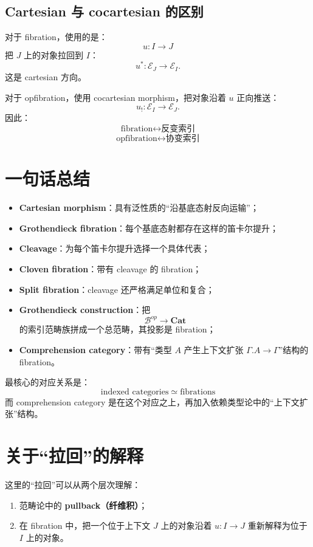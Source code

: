 \documentclass[12pt,a4paper]{article}
\begin{document}
\subsection{Cartesian 与 cocartesian 的区别}
对于 fibration，使用的是：
\[
u:I\to J
\]
把 \(J\) 上的对象拉回到 \(I\)：
\[
u^*:\mathcal{E}_J\to\mathcal{E}_I.
\]
这是 cartesian 方向。

对于 opfibration，使用 cocartesian morphism，把对象沿着 \(u\) 正向推送：
\[
u_!:\mathcal{E}_I\to\mathcal{E}_J.
\]
因此：
\[
\text{fibration}\leftrightarrow\text{反变索引}
\]
\[
\text{opfibration}\leftrightarrow\text{协变索引}
\]

\section{一句话总结}
\begin{itemize}
  \item \textbf{Cartesian morphism}：具有泛性质的“沿基底态射反向运输”；
  \item \textbf{Grothendieck fibration}：每个基底态射都存在这样的笛卡尔提升；
  \item \textbf{Cleavage}：为每个笛卡尔提升选择一个具体代表；
  \item \textbf{Cloven fibration}：带有 cleavage 的 fibration；
  \item \textbf{Split fibration}：cleavage 还严格满足单位和复合；
  \item \textbf{Grothendieck construction}：把
  \[
  \mathcal{B}^{op}\to\mathbf{Cat}
  \]
  的索引范畴族拼成一个总范畴，其投影是 fibration；
  \item \textbf{Comprehension category}：带有“类型 \(A\) 产生上下文扩张
  \(\Gamma.A\to\Gamma\)”结构的 fibration。
\end{itemize}

最核心的对应关系是：
\[
\boxed{
\text{indexed categories}
\;\simeq\;
\text{fibrations}
}
\]
而 comprehension category 是在这个对应之上，再加入依赖类型论中的“上下文扩张”结构。

\newpage

\section{关于“拉回”的解释}

这里的“拉回”可以从两个层次理解：
\begin{enumerate}
  \item 范畴论中的 \textbf{pullback（纤维积）}；
  \item 在 fibration 中，把一个位于上下文 \(J\) 上的对象沿着 \(u:I\to J\) 重新解释为位于 \(I\) 上的对象。
\end{enumerate}
\end{document}
